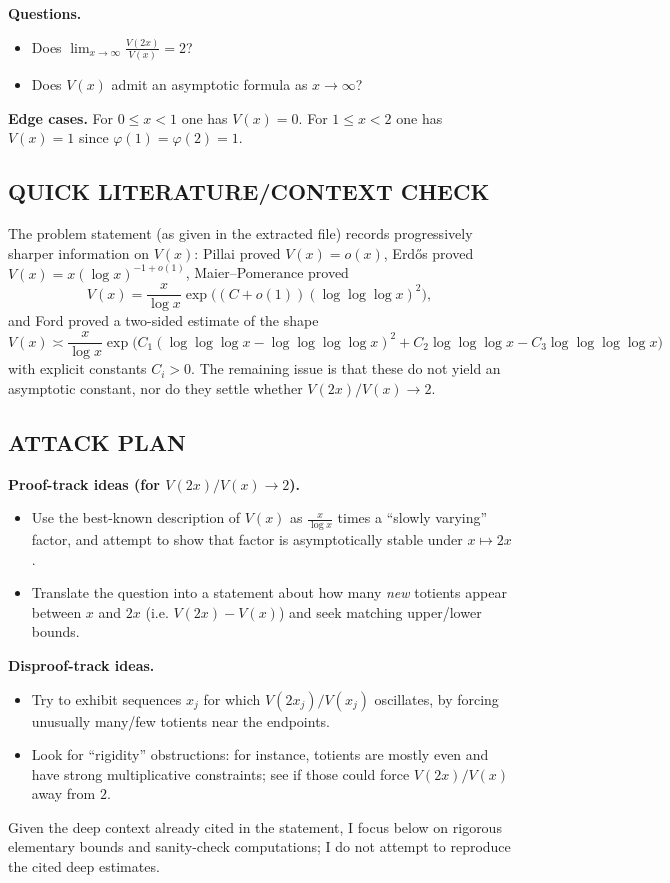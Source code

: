 \textbf{Questions.}
\begin{itemize}
\item[(Q1)] Does $\displaystyle \lim_{x\to\infty} \frac{V(2x)}{V(x)}=2$?
\item[(Q2)] Does $V(x)$ admit an asymptotic formula as $x\to\infty$?
\end{itemize}
\textbf{Edge cases.} For $0\le x<1$ one has $V(x)=0$. For $1\le x<2$ one has $V(x)=1$ since $\varphi(1)=\varphi(2)=1$.

\subsection*{QUICK LITERATURE/CONTEXT CHECK}
The problem statement (as given in the extracted file) records progressively sharper information on $V(x)$: Pillai proved $V(x)=o(x)$, Erd\H{o}s proved $V(x)=x(\log x)^{-1+o(1)}$, Maier--Pomerance proved
\[
V(x)=\frac{x}{\log x}\exp\big((C+o(1))(\log\log\log x)^2\big),
\]
and Ford proved a two-sided estimate of the shape
\[
V(x)\asymp \frac{x}{\log x}\exp\Big( C_1(\log\log\log x-\log\log\log\log x)^2+ C_2\log\log\log x- C_3\log\log\log\log x\Big)
\]
with explicit constants $C_i>0$. The remaining issue is that these do not yield an asymptotic constant, nor do they settle whether $V(2x)/V(x)\to 2$.

\subsection*{ATTACK PLAN}
\textbf{Proof-track ideas (for $V(2x)/V(x)\to 2$).}
\begin{itemize}
\item Use the best-known description of $V(x)$ as $\frac{x}{\log x}$ times a ``slowly varying'' factor, and attempt to show that factor is asymptotically stable under $x\mapsto 2x$.
\item Translate the question into a statement about how many \emph{new} totients appear between $x$ and $2x$ (i.e. $V(2x)-V(x)$) and seek matching upper/lower bounds.
\end{itemize}
\textbf{Disproof-track ideas.}
\begin{itemize}
\item Try to exhibit sequences $x_j$ for which $V(2x_j)/V(x_j)$ oscillates, by forcing unusually many/few totients near the endpoints.
\item Look for ``rigidity'' obstructions: for instance, totients are mostly even and have strong multiplicative constraints; see if those could force $V(2x)/V(x)$ away from $2$.
\end{itemize}
Given the deep context already cited in the statement, I focus below on rigorous elementary bounds and sanity-check computations; I do not attempt to reproduce the cited deep estimates.

